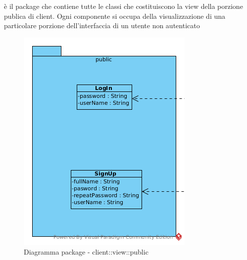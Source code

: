 è il package che contiene tutte le classi che costituiscono la view della porzione publica di client. Ogni componente si occupa della visualizzazione di una particolare porzione dell'interfaccia di un utente non autenticato\begin{center}
		\begin{figure}[H]
			\centering \includegraphics[scale=4, max width=\textwidth, max height=\myheight]{../img/diagrammiClassi/client/view/public.png}
			\caption{Diagramma package - client::view::public}
		\end{figure}
	\end{center}\hypertarget{client::view::public::LogIn}{}
